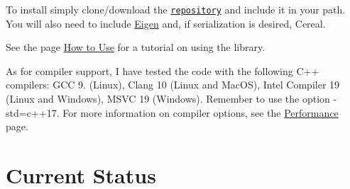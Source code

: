 \begin{DoxyItemize}
\item To install simply clone/download the \href{https://github.com/NickG-Math/Mackey}{\tt repository} and include it in your path. You will also need to include \hyperlink{namespaceEigen}{Eigen} and, if serialization is desired, Cereal.
\item See the page \hyperlink{use}{How to Use} for a tutorial on using the library.
\item As for compiler support, I have tested the code with the following C++ compilers\+: G\+CC 9. (Linux), Clang 10 (Linux and Mac\+OS), Intel Compiler 19 (Linux and Windows), M\+S\+VC 19 (Windows). Remember to use the option {\ttfamily -\/std=c++17}. For more information on compiler options, see the \hyperlink{perf}{Performance} page.
\end{DoxyItemize}\hypertarget{index_status}{}\section{Current Status}\label{index_status}

